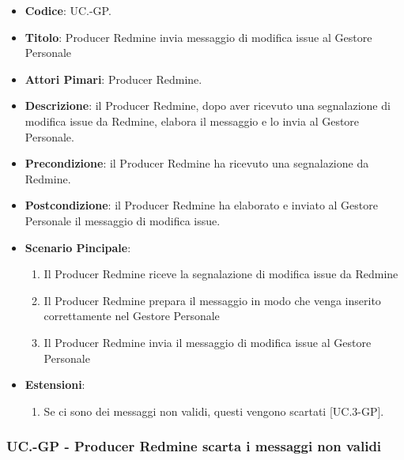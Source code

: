 		\begin{itemize}
			\item \textbf{Codice}: UC\theuccount.\thesubuccount-GP.
			\item \textbf{Titolo}: Producer Redmine invia messaggio di modifica issue al Gestore Personale
			\item \textbf{Attori Pimari}: Producer Redmine.
			\item \textbf{Descrizione}: il Producer Redmine, dopo aver ricevuto una segnalazione di modifica issue da Redmine, elabora il messaggio e lo invia al Gestore Personale.
			\item \textbf{Precondizione}: il Producer Redmine ha ricevuto una segnalazione da Redmine.
			\item \textbf{Postcondizione}: il Producer Redmine ha elaborato e inviato al Gestore Personale il messaggio di modifica issue.
			\item \textbf{Scenario Pincipale}: 
			\begin{enumerate}
				\item Il Producer Redmine riceve la segnalazione di modifica issue da Redmine
				\item Il Producer Redmine prepara il messaggio in modo che venga inserito correttamente nel Gestore Personale
				\item Il Producer Redmine invia il messaggio di
				modifica issue al Gestore Personale
			\end{enumerate}
			\item \textbf{Estensioni}: 
			\begin{enumerate}
				\item Se ci sono dei messaggi non validi, questi vengono scartati [UC\theuccount.3-GP].
			\end{enumerate}
		\end{itemize}
	
	\subsubsection{UC\theuccount.\thesubuccount-GP - Producer Redmine scarta i messaggi non validi}
	
